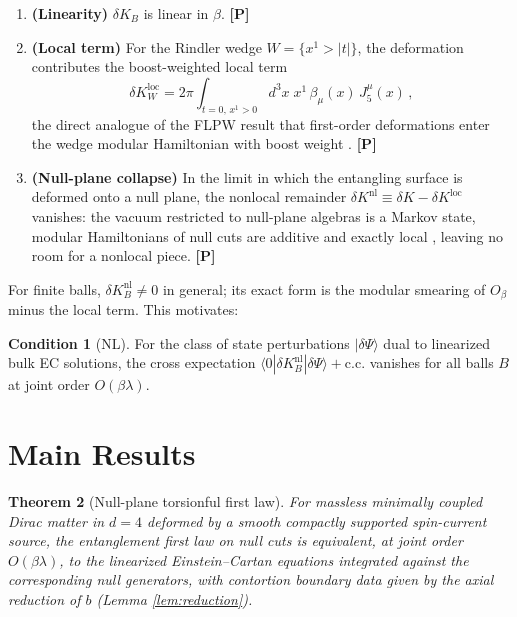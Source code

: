 \documentclass[11pt]{article}
\newtheorem{theorem}{Theorem}[section]
\theoremstyle{definition}
\newtheorem{condition}[theorem]{Condition}
\newcommand{\pP}{\textbf{[P]}}
\begin{document}
\begin{enumerate}[itemsep=2pt]
\item \textbf{(Linearity)} $\delta K_B$ is linear in $\beta$. \pP{}
\item \textbf{(Local term)} For the Rindler wedge $W=\{x^1>|t|\}$, the
deformation contributes the boost-weighted local term
\begin{equation}
\delta K_W^{\mathrm{loc}}
=2\pi\!\int_{t=0,\,x^1>0}\!\! d^{3}x\;x^1\,
\beta_\mu(x)\,J_5^\mu(x)\,,
\label{eq:localterm}
\end{equation}
the direct analogue of the FLPW result that first-order deformations enter
the wedge modular Hamiltonian with boost weight \cite{FLPW2016}. \pP{}
\item \textbf{(Null-plane collapse)} In the limit in which the entangling
surface is deformed onto a null plane, the nonlocal remainder
$\delta K^{\mathrm{nl}}\equiv\delta K-\delta K^{\mathrm{loc}}$ vanishes:
the vacuum restricted to null-plane algebras is a Markov state, modular
Hamiltonians of null cuts are additive and exactly local
\cite{CasiniTesteTorroba2017}, leaving no room for a nonlocal piece.
\pP{}
\end{enumerate}

For finite balls, $\delta K_B^{\mathrm{nl}}\neq 0$ in general; its exact
form is the modular smearing of $O_\beta$ minus the local term. This
motivates:

\begin{condition}[NL]
\label{cond:NL}
For the class of state perturbations $|\delta\Psi\rangle$ dual to
linearized bulk EC solutions, the cross expectation
$\langle 0|\delta K_B^{\mathrm{nl}}|\delta\Psi\rangle+\mathrm{c.c.}$
vanishes for all balls $B$ at joint order $O(\beta\lambda)$.
\end{condition}

\section{Main Results}

\begin{theorem}[Null-plane torsionful first law]
\label{thm:nullplane}
For massless minimally coupled Dirac matter in $d=4$ deformed by a smooth
compactly supported spin-current source, the entanglement first law on null
cuts is equivalent, at joint order $O(\beta\lambda)$, to the linearized
Einstein--Cartan equations integrated against the corresponding null
generators, with contortion boundary data given by the axial reduction of
$b$ (Lemma \ref{lem:reduction}).
\end{theorem}
\end{document}
